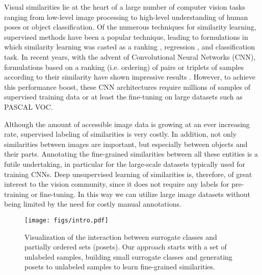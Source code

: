 \documentclass[10pt,twocolumn,letterpaper]{article}
\begin{document}

Visual similarities lie at the heart of a large number of computer vision tasks ranging from low-level image processing to high-level understanding of human poses or object classification. Of the numerous techniques for similarity learning, supervised methods have been a popular technique, leading to formulations in which similarity learning was casted as a ranking \cite{simlearning1}, regression \cite{simregression}, and classification \cite{videoparsing} task. In recent years, with the advent of Convolutional Neural Networks (CNN), formulations based on a ranking (i.e. ordering) of pairs or triplets of samples according to their similarity have shown impressive results \cite{ConvNetpretext2}. However, to achieve this  performance boost, these CNN architectures require millions of samples of supervised training data or at least the fine-tuning \cite{ConvNetpretext1} on large datasets such as PASCAL VOC. 


Although the amount of accessible image data is growing at an ever increasing rate, supervised labeling of similarities is very costly. In addition, not only similarities between images are important, but especially between objects and their parts.  Annotating the fine-grained similarities between all these entities is a futile undertaking, in particular for the large-scale datasets typically used for training CNNs. Deep unsupervised learning of similarities is, therefore, of great interest to the vision community, since it does not require any labels for pre-training or fine-tuning. In this way we can utilize large image datasets without being limited by the need for costly manual annotations.

\begin{figure}[!t]
\centering
\texttt{[image: figs/intro.pdf]}
\caption{Visualization of the interaction between surrogate classes and partially ordered sets (posets). Our approach starts with a set of unlabeled samples, building small surrogate classes and generating posets to unlabeled samples to learn fine-grained similarities.}
\label{fig:intro}
\end{figure}
\end{document}
